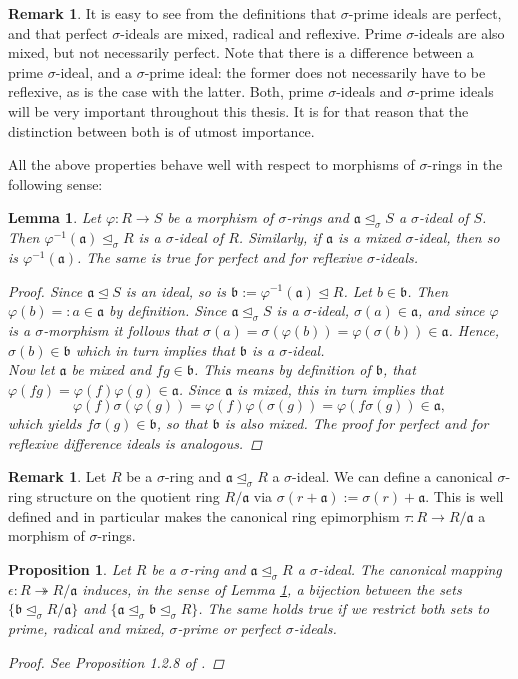 \documentclass{article}
\def\a{\mathfrak{a}}
\def\b{\mathfrak{b}}
\def\s{\sigma}
\def\si{\unlhd_{\sigma}}
\newenvironment{bew}{\begin{proof}[Proof]}{\end{proof}}
\theoremstyle{plain}
\newtheorem{prop}[Satz]{Proposition}
\newtheorem{lem}[Satz]{Lemma}
\theoremstyle{definition}
\newtheorem{rem}[Satz]{Remark}
\begin{document}
\begin{rem}
It is easy to see from the definitions that $\s$-prime ideals are perfect, and that perfect $\s$-ideals are mixed, radical and reflexive. Prime $\s$-ideals are also mixed, but not necessarily perfect. Note that there is a difference between a prime $\s$-ideal, and a $\s$-prime ideal:
the former does not necessarily have to be reflexive, as is the case with the latter. Both, prime $\s$-ideals and $\s$-prime ideals will be very important throughout this thesis. It is for that reason that the distinction between both is of utmost importance.
\end{rem}

All the above properties behave well with respect to morphisms of $\s$-rings in the following sense:
\begin{lem}\label{bijmapping}
Let $\varphi: R \rightarrow S$ be a morphism of $\s$-rings and $\a \si S$ a $\s$-ideal of $S$. Then $\varphi^{-1}(\a) \si R$ is a $\s$-ideal of $R$. Similarly, if $\a$ is a mixed $\s$-ideal, then so is $\varphi^{-1}(\a)$. The same is true for perfect and for reflexive $\s$-ideals.
\begin{bew}
Since $\a \unlhd S$ is an ideal, so is $\b := \varphi^{-1}(\a) \unlhd R$. Let $b \in \b$. Then $\varphi(b) =: a \in \a$ by definition. Since $\a \si S$ is a $\s$-ideal, $\s(a) \in \a$, and since $\varphi$ is a $\s$-morphism
it follows that $\sigma(a) = \sigma(\varphi(b)) = \varphi (\s (b)) \in \a$. Hence, $\s(b) \in \b$ which in turn implies that $\b$ is a $\s$-ideal. \\
\indent Now let $\a$ be mixed and $fg \in \b$. This means by definition of $\b$, 
that $\varphi(fg) = \varphi(f) \varphi(g) \in \a$. Since $\a$ is mixed, this in turn implies that $$\varphi(f) \s( \varphi(g)) = \varphi(f) \varphi(\s(g)) = \varphi(f\s(g)) \in \a,$$ which yields $f\s(g) \in \b$, so that $\b$ is also mixed. 
The proof for perfect and for reflexive difference ideals is analogous.
\end{bew}
\end{lem}

\begin{rem}
Let $R$ be a $\s$-ring and $\a \si R$ a $\s$-ideal. We can define a canonical $\s$-ring structure on the quotient ring $R/\a$ via $\s(r+\a):= \s(r) + \a$. 
This is well defined and in particular makes the canonical ring epimorphism $\tau: R \rightarrow R/\a$ a morphism of $\s$-rings.
\end{rem}

\begin{prop}\label{bijideals}
Let $R$ be a $\s$-ring and $\a \si R$ a $\s$-ideal. The canonical mapping $\epsilon: R \twoheadrightarrow R/\a$ induces, in the sense of Lemma \ref{bijmapping}, a bijection between the sets $\{ \b \si R/\a \}$ and $\{ \a \si \b \si R \}$. The same holds true if we restrict both sets to prime, radical and mixed, $\s$-prime or perfect $\s$-ideals.
\begin{bew}
See Proposition 1.2.8 of \cite{wibmer}.
\end{bew}
\end{prop}
\end{document}
